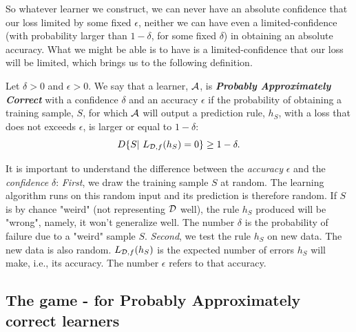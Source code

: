 {	So whatever learner we construct, we can never have an absolute confidence that our loss limited by some fixed $\epsilon$, neither we can have even a limited-confidence (with probability larger than  $1-\delta$, for some fixed $\delta$) in obtaining an absolute accuracy. 	What we might be able is to have is a limited-confidence that our loss will be limited, which brings us to the following definition.
	
\begin{definition}	
	Let $\delta>0$ and $\epsilon>0$. We say that a learner, $\mathcal{A}$, is \textit{\textbf{Probably Approximately Correct}} with a confidence $\delta$ and an accuracy $\epsilon$ if the probability of obtaining a training sample, $S$, for which $\mathcal{A}$ will output a prediction rule, $h_S$, with a loss that does not exceeds $\epsilon$, is larger or equal to $1-\delta$:
		$$D\{S|~ L_{\mathcal{D},f}(h_S)=0\}\ge 1-\delta.$$
\end{definition}




It is important to understand the difference between the  \textit{accuracy}  $\epsilon$ and the \textit{confidence} $\delta$:
\textit{First}, we draw the training sample $S$ at random. The learning algorithm runs on this random input and its prediction is therefore random.
If $S$ is by chance "weird" (not representing $\mathcal{D}$ well), the rule $h_S$ produced will be "wrong", namely, it won't generalize well. The number $\delta$ is the probability of failure due to a "weird" sample $S$. \textit{Second}, we test the rule $h_S$ on new data. The new data is also random. $L_{\mathcal{D},f}(h_S)$ is  the expected number of errors $h_S$ will make, i.e., its accuracy. The number $\epsilon$ refers to that accuracy.

\subsection{The game - for Probably Approximately correct learners}

}
